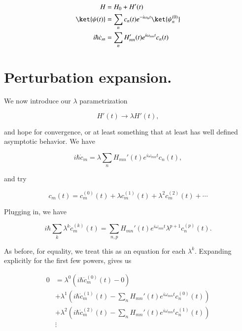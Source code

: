 \begin{align}\label{eqn:qmTwoL7:390}
H &= H_0 + H'(t) \\
\ket{\psi(t)} &= \sum_n c_n(t) e^{-i\omega_n t} \ket{\psi_n^{(0)}} \\
i \hbar \dot{c}_m &= \sum_n H_{mn}'(t) e^{i \omega_{mn} t} c_n(t)
\end{align}

\section{Perturbation expansion.}

We now introduce our $\lambda$ parametrization

\begin{equation}\label{eqn:qmTwoL7:410}
H'(t) \rightarrow \lambda H'(t),
\end{equation}

and hope for convergence, or at least something that at least has well defined asymptotic behavior.  We have

\begin{equation}\label{eqn:qmTwoL7:430}
i \hbar \dot{c}_m = \lambda \sum_n H_{mn}'(t) e^{i \omega_{mn} t} c_n(t),
\end{equation}

and try

\begin{equation}\label{eqn:qmTwoL7:450}
c_m(t) = c_m^{(0)}(t) + \lambda c_m^{(1)}(t) + \lambda^2 c_m^{(2)}(t) + \cdots
\end{equation}

Plugging in, we have

\begin{equation}\label{eqn:qmTwoL7:470}
i \hbar
\sum_k
\lambda^k \dot{c}_m^{(k)}(t)
=
\sum_{n,p} H_{mn}'(t) e^{i \omega_{mn} t}
\lambda^{p+1} c_n^{(p)}(t).
\end{equation}

As before, for equality, we treat this as an equation for each $\lambda^k$.  Expanding explicitly for the first few powers, gives us

\begin{align*}
0
&= \lambda^0 \left( i \hbar \dot{c}_m^{(0)}(t) - 0 \right) \\
&+ \lambda^1 \left( i \hbar \dot{c}_m^{(1)}(t) -
\sum_{n} H_{mn}'(t) e^{i \omega_{mn} t}
c_n^{(0)}(t)
\right) \\
&+ \lambda^2 \left( i \hbar \dot{c}_m^{(2)}(t) -
\sum_{n} H_{mn}'(t) e^{i \omega_{mn} t}
c_n^{(1)}(t)
\right) \\
&\vdots
\end{align*}

